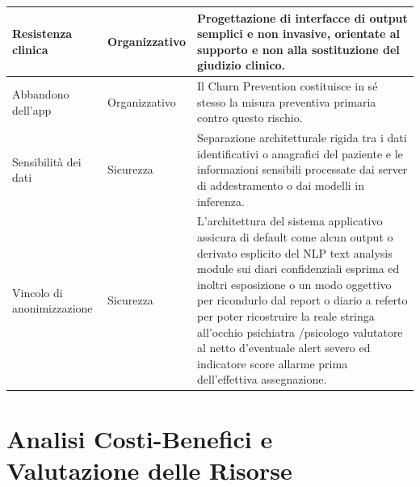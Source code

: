 \begin{table}[h]
\begin{tabular}{|p{}|p{}|p{}|}
        \hline
        Resistenza clinica         & Organizzativo      & Progettazione di interfacce di output semplici e non invasive, orientate al supporto e non alla sostituzione del giudizio clinico.                                                                                                                                                                                                                                                                                                         \\
        \hline
        Abbandono dell'app         & Organizzativo      & Il Churn Prevention costituisce in sé stesso la misura preventiva primaria contro questo rischio.                                                                                                                                                                                                                                                                                                                                          \\
        \hline
        Sensibilità dei dati       & Sicurezza          & Separazione architetturale rigida tra i dati identificativi o anagrafici del paziente e le informazioni sensibili processate dai server di addestramento o dai modelli in inferenza.                                                                                                                                                                                                                                                       \\
        \hline
        Vincolo di anonimizzazione & Sicurezza          & L'architettura del sistema applicativo assicura di default come alcun output o derivato esplicito del NLP text analysis module sui diari confidenziali esprima ed inoltri esposizione o un modo oggettivo per ricondurlo dal report o diario a referto per poter ricostruire la reale stringa all'occhio psichiatra /psicologo valutatore al netto d'eventuale alert severo ed indicatore score allarme prima dell'effettiva assegnazione. \\
        \hline
    \end{tabular}
\end{table}
\clearpage
\section{Analisi Costi-Benefici e Valutazione delle Risorse}
\label{sec:costi_benefici}

